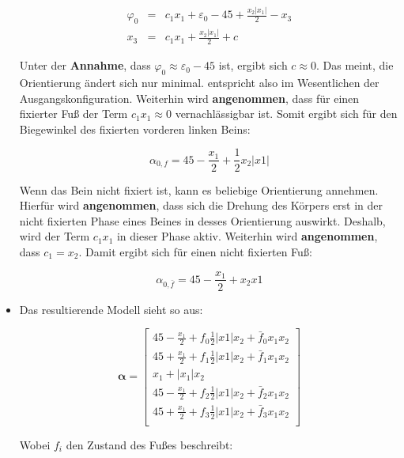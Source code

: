 \documentclass[10pt,a4paper]{article}
\begin{document}
\begin{itemize}
\begin{eqnarray}
\varphi_0 &=& c_1 x_1 + \varepsilon_0 - 45 + \frac{x_2|x_1|}{2} -x_3 \\
x_3 &=&  c_1 x_1 + \frac{x_2|x_1|}{2} + c
\end{eqnarray}

Unter der \textbf{Annahme}, dass $\varphi_0 \approx \varepsilon_0 - 45$ ist, ergibt sich $c \approx 0$. Das meint, die Orientierung ändert sich nur minimal. entspricht also im Wesentlichen der Ausgangskonfiguration.
Weiterhin wird \textbf{angenommen}, dass für einen fixierter Fuß der Term $c_1x_1 \approx 0$ vernachlässigbar ist.
Somit ergibt sich für den Biegewinkel des fixierten vorderen linken Beins:

\begin{equation}
\alpha_{0,f} = 45-\frac{x_1}{2} + \frac{1}{2}x_2|x1|
\end{equation}

Wenn das Bein nicht fixiert ist, kann es beliebige Orientierung annehmen.
Hierfür wird \textbf{angenommen}, dass sich die Drehung des Körpers erst in der nicht fixierten Phase eines Beines in desses Orientierung auswirkt.
Deshalb, wird der Term $c_1x_1$ in dieser Phase aktiv.
Weiterhin wird \textbf{angenommen}, dass $c_1 = x_2$. Damit ergibt sich für einen nicht fixierten Fuß:

\begin{equation}
\alpha_{0,\bar{f}} = 45-\frac{x_1}{2} + x_2x1
\end{equation}


\item Das resultierende Modell sieht so aus:

\begin{equation}
\bm{\alpha} = \begin{bmatrix}
45 - \frac{x_1}{2}+ f_0\frac{1}{2}|x1|x_2  + \bar{f}_0x_1x_2  \\
45 + \frac{x_1}{2} + f_1\frac{1}{2}|x1|x_2+ \bar{f}_1x_1x_2  \\
x_1 + |x_1|x_2 \\
45 - \frac{x_1}{2}  + f_2\frac{1}{2}|x1|x_2 + \bar{f}_2x_1x_2\\
45 + \frac{x_1}{2}  + f_3\frac{1}{2}|x1|x_2+ \bar{f}_3x_1x_2 \\
\end{bmatrix}
\end{equation}

Wobei $f_i$ den Zustand des Fußes beschreibt:


\end{itemize}
\end{document}
